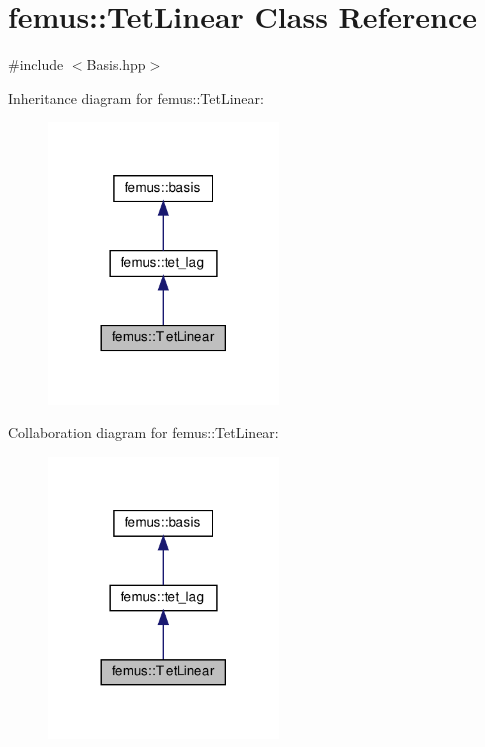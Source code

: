 \hypertarget{classfemus_1_1_tet_linear}{}\section{femus\+:\+:Tet\+Linear Class Reference}
\label{classfemus_1_1_tet_linear}


{\ttfamily \#include $<$Basis.\+hpp$>$}



Inheritance diagram for femus\+:\+:Tet\+Linear\+:
\nopagebreak
\begin{figure}[H]
\begin{center}
\leavevmode
\includegraphics[width=173pt]{classfemus_1_1_tet_linear__inherit__graph}
\end{center}
\end{figure}


Collaboration diagram for femus\+:\+:Tet\+Linear\+:
\nopagebreak
\begin{figure}[H]
\begin{center}
\leavevmode
\includegraphics[width=173pt]{classfemus_1_1_tet_linear__coll__graph}
\end{center}
\end{figure}
